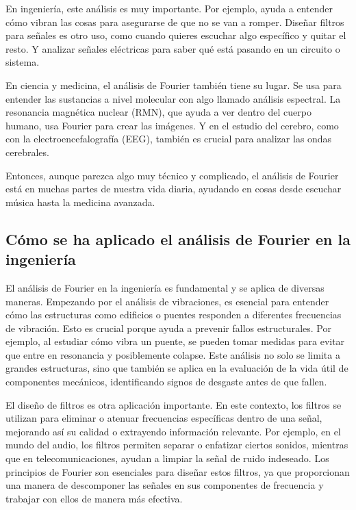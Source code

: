 En ingeniería, este análisis es muy importante. Por ejemplo, ayuda a entender cómo vibran las cosas para asegurarse de que no se van a romper. Diseñar filtros para señales es otro uso, como cuando quieres escuchar algo específico y quitar el resto. Y analizar señales eléctricas para saber qué está pasando en un circuito o sistema.

En ciencia y medicina, el análisis de Fourier también tiene su lugar. Se usa para entender las sustancias a nivel molecular con algo llamado análisis espectral. La resonancia magnética nuclear (RMN), que ayuda a ver dentro del cuerpo humano, usa Fourier para crear las imágenes. Y en el estudio del cerebro, como con la electroencefalografía (EEG), también es crucial para analizar las ondas cerebrales.

Entonces, aunque parezca algo muy técnico y complicado, el análisis de Fourier está en muchas partes de nuestra vida diaria, ayudando en cosas desde escuchar música hasta la medicina avanzada.

\subsection{Cómo se ha aplicado el análisis de Fourier en la ingeniería}

El análisis de Fourier en la ingeniería es fundamental y se aplica de diversas maneras. Empezando por el análisis de vibraciones, es esencial para entender cómo las estructuras como edificios o puentes responden a diferentes frecuencias de vibración. Esto es crucial porque ayuda a prevenir fallos estructurales. Por ejemplo, al estudiar cómo vibra un puente, se pueden tomar medidas para evitar que entre en resonancia y posiblemente colapse. Este análisis no solo se limita a grandes estructuras, sino que también se aplica en la evaluación de la vida útil de componentes mecánicos, identificando signos de desgaste antes de que fallen.

El diseño de filtros es otra aplicación importante. En este contexto, los filtros se utilizan para eliminar o atenuar frecuencias específicas dentro de una señal, mejorando así su calidad o extrayendo información relevante. Por ejemplo, en el mundo del audio, los filtros permiten separar o enfatizar ciertos sonidos, mientras que en telecomunicaciones, ayudan a limpiar la señal de ruido indeseado. Los principios de Fourier son esenciales para diseñar estos filtros, ya que proporcionan una manera de descomponer las señales en sus componentes de frecuencia y trabajar con ellos de manera más efectiva.


